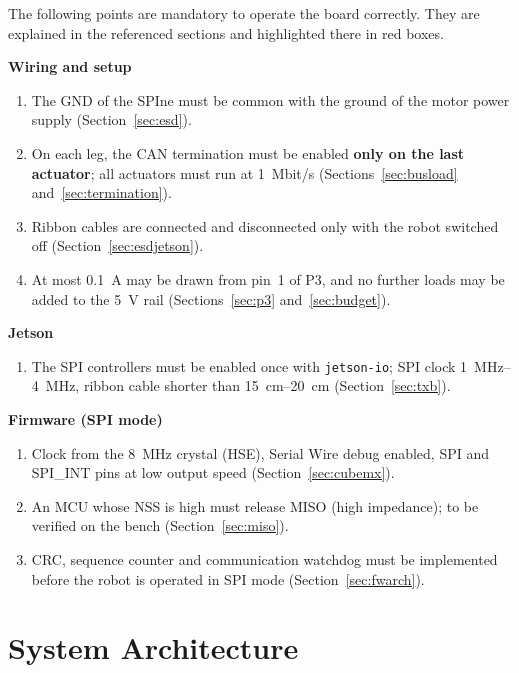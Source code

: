 \documentclass[11pt,a4paper]{article}
\newcommand{\reqhead}[1]{\textbf{\color{reqred}#1}}
\begin{document}
The following points are mandatory to operate the board correctly. They are explained in the
referenced sections and highlighted there in red boxes.

\begin{reqbox}
\reqhead{Wiring and setup}
\begin{enumerate}[leftmargin=*, nosep]
    \item The GND of the SPIne must be common with the ground of the motor power supply
    (Section~\ref{sec:esd}).
    \item On each leg, the CAN termination must be enabled \textbf{only on the last actuator}; all
    actuators must run at \qty{1}{Mbit/s} (Sections~\ref{sec:busload} and~\ref{sec:termination}).
    \item Ribbon cables are connected and disconnected only with the robot switched off
    (Section~\ref{sec:esdjetson}).
    \item At most \qty{0.1}{A} may be drawn from pin~1 of P3, and no further loads may be added to the
    \qty{5}{V} rail (Sections~\ref{sec:p3} and~\ref{sec:budget}).
\end{enumerate}
\reqhead{Jetson}
\begin{enumerate}[leftmargin=*, nosep, resume]
    \item The SPI controllers must be enabled once with \texttt{jetson-io}; SPI clock \qtyrange{1}{4}{MHz},
    ribbon cable shorter than \qtyrange{15}{20}{cm} (Section~\ref{sec:txb}).
\end{enumerate}
\reqhead{Firmware (SPI mode)}
\begin{enumerate}[leftmargin=*, nosep, resume]
    \item Clock from the \qty{8}{MHz} crystal (HSE), Serial Wire debug enabled, SPI and SPI\_INT pins
    at low output speed (Section~\ref{sec:cubemx}).
    \item An MCU whose NSS is high must release MISO (high impedance); to be verified on the
    bench (Section~\ref{sec:miso}).
    \item CRC, sequence counter and communication watchdog must be implemented before the
    robot is operated in SPI mode (Section~\ref{sec:fwarch}).
\end{enumerate}
\end{reqbox}

\newpage
\section{System Architecture}
\end{document}
